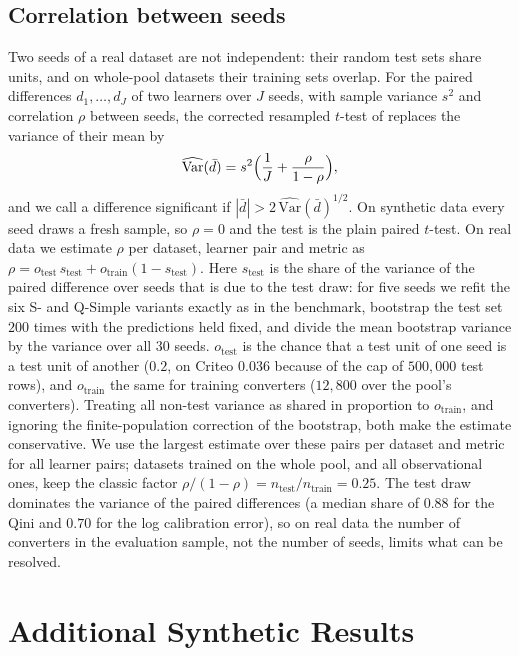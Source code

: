 \documentclass{article}
\begin{document}
\subsection{Correlation between seeds}
\label{app:stest}
Two seeds of a real dataset are not independent: their random test sets share
units, and on whole-pool datasets their training sets overlap. For the paired
differences $d_1, \dots, d_J$ of two learners over $J$ seeds, with sample
variance $s^2$ and correlation $\rho$ between seeds, the corrected resampled
$t$-test of \citet{nadeau2003inference} replaces the variance of their mean
by
\[
  \widehat{\mathrm{Var}}(\bar d) = s^2 \Bigl(\frac{1}{J} + \frac{\rho}{1-\rho}\Bigr),
\]
and we call a difference significant if $|\bar d| > 2\,
\widehat{\mathrm{Var}}(\bar d)^{1/2}$. On synthetic data every seed draws a
fresh sample, so $\rho = 0$ and the test is the plain paired $t$-test. On
real data we estimate $\rho$ per dataset, learner pair and metric as
$\rho = o_\text{test}\, s_\text{test} + o_\text{train}(1 - s_\text{test})$.
Here $s_\text{test}$ is the share of the variance of the paired difference
over seeds that is due to the test draw: for five seeds we refit the six S-
and Q-Simple variants exactly as in the benchmark, bootstrap the test set
$200$ times with the predictions held fixed, and divide the mean bootstrap
variance by the variance over all $30$ seeds. $o_\text{test}$ is the chance
that a test unit of one seed is a test unit of another ($0.2$, on Criteo
$0.036$ because of the cap of $500{,}000$ test rows), and $o_\text{train}$ the
same for training converters ($12{,}800$ over the pool's converters).
Treating all non-test variance as shared in proportion to $o_\text{train}$,
and ignoring the finite-population correction of the bootstrap, both make the
estimate conservative. We use the largest estimate over these pairs per
dataset and metric for all learner pairs; datasets trained on the whole pool, and all observational
ones, keep the classic factor $\rho/(1-\rho) = n_\text{test}/n_\text{train} =
0.25$.
The test draw dominates the variance of the paired differences (a median
share of $0.88$ for the Qini and $0.70$ for the log calibration error), so on
real data the number of converters in the evaluation sample, not the number
of seeds, limits what can be resolved.

\section{Additional Synthetic Results}
\label{app:syn-extra}
\end{document}
